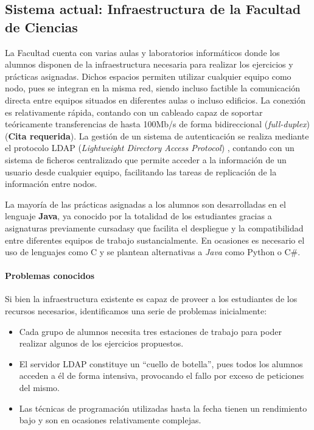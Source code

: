 \subsection{Sistema actual: Infraestructura de la Facultad de Ciencias}
\label{infraestructura}
La Facultad cuenta con varias aulas y laboratorios informáticos donde los alumnos disponen de la infraestructura necesaria para realizar los ejercicios y prácticas asignadas. Dichos espacios permiten utilizar cualquier equipo como nodo, pues se integran en la misma red, siendo incluso factible la comunicación directa entre equipos situados en diferentes aulas o incluso edificios. La conexión es relativamente rápida, contando con un cableado capaz de soportar teóricamente transferencias de hasta 100Mb/s de forma bidireccional (\textit{full-duplex}) (\textbf{Cita requerida}). La gestión de un sistema de autenticación se realiza mediante el protocolo LDAP (\textit{Lightweight Directory Access Protocol}) \cite{RFC4516-comment}, contando con un sistema de ficheros centralizado que permite acceder a la información de un usuario desde cualquier equipo, facilitando las tareas de replicación de la información entre nodos.

La mayoría de las prácticas asignadas a los alumnos son desarrolladas en el lenguaje \textbf{Java}, ya conocido por la totalidad de los estudiantes gracias a asignaturas previamente cursadas\citationneeded y que facilita el despliegue y la compatibilidad entre diferentes equipos de trabajo sustancialmente. En ocasiones es necesario el uso de lenguajes como C y se plantean alternativas a \textit{Java} como Python o C\#.

\paragraph{Problemas conocidos}

Si bien la infraestructura existente es capaz de proveer a los estudiantes de los recursos necesarios, identificamos una serie de problemas inicialmente:

\begin{itemize}
  \item Cada grupo de alumnos necesita tres estaciones de trabajo para poder realizar algunos de los ejercicios propuestos.
  \item El servidor LDAP constituye un ``cuello de botella'', pues todos los alumnos acceden a él de forma intensiva, provocando el fallo por exceso de peticiones del mismo.
  \item Las técnicas de programación utilizadas hasta la fecha tienen un rendimiento bajo y son en ocasiones relativamente complejas.
\end{itemize}

